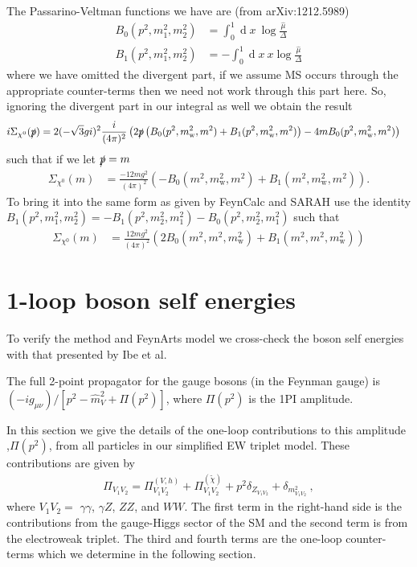\documentclass[11pt]{article}
\def\sp{\slashed{p}}
\def\cn{\chi^0}
\renewcommand{\d}{\ensuremath{\operatorname{d}\!}}
\begin{document}
The Passarino-Veltman functions we have are (from arXiv:1212.5989)
\begin{align}
B_0(p^2,m_1^2,m_2^2)&=\int_0^1\!\d x \ \log\frac{\hat{\mu}}{\Delta}\\
B_1(p^2,m_1^2,m_2^2)&=-\int_0^1\!\d x \ x\log\frac{\hat{\mu}}{\Delta}
\end{align}
where we have omitted the divergent part, if we assume MS occurs through the appropriate counter-terms then we need not work through this part here.  So, ignoring the divergent part in our integral as well we obtain the result
\begin{align}
i\Sigma_{\cn}(\slashed{p})&= 2(-\sqrt{3}gi)^2 \frac{i}{(4\pi)^2}  \left(2\sp\left( B_0(p^2,m_{\text{w}}^2,m^2)+B_1(p^2,m_{\text{w}}^2,m^2)\right)-4mB_0(p^2,m_{\text{w}}^2,m^2)\right)
\end{align}
such that if we let $\sp=m$
\begin{align}
\Sigma_{\cn}(m)&= \frac{-12mg^2}{(4\pi)^2}   \left( -B_0(m^2,m_{\text{w}}^2,m^2)+B_1(m^2,m_{\text{w}}^2,m^2)\right).
\end{align}
To bring it into the same form as given by FeynCalc and SARAH use the identity $B_1(p^2,m_1^2,m_2^2)=-B_1(p^2,m_2^2,m_1^2)-B_0(p^2,m_2^2,m_1^2)$ such that
\begin{align}
\Sigma_{\cn}(m)&= \frac{12mg^2}{(4\pi)^2}   \left( 2B_0(m^2,m^2,m_{\text{w}}^2)+B_1(m^2,m^2,m_{\text{w}}^2)\right)
\end{align}


\section{1-loop boson self energies}

To verify the method and FeynArts model we cross-check the boson self energies with that presented by Ibe et al.


The full 2-point propagator for the gauge bosons (in the Feynman gauge) is $(-ig_{\mu\nu})/[p^2 - \hat{m}_V^2 + \Pi(p^2)]$, where $\Pi(p^2)$ is the 1PI amplitude.



In this section we give the details of the one-loop contributions to this amplitude
,$\Pi(p^2)$, from all particles in our simplified EW triplet model.  These contributions are given by
{\small
\begin{eqnarray}
\Pi_{V_1 V_2}
= \Pi_{V_1 V_2}^{(V, h)}
+ \Pi_{V_1 V_2}^{(\tilde{\chi})}
+ p^2 \delta_{Z_{V_1 V_2}}
+ \delta_{m^2_{V_1 V_2}}\ ,
\end{eqnarray}
}where $V_1 V_2 =$ $\gamma \gamma$, $\gamma Z$, $ZZ$, and $WW$. The first term in the right-hand side is the contributions from the gauge-Higgs sector of the SM and the second term is from the electroweak triplet. 
The third and fourth terms are the one-loop counter-terms which we determine in the following section.
\end{document}
